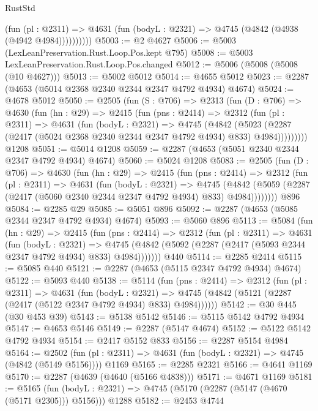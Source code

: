\begin{lexlean}{RustStd}
\begin{coremodule}
              (fun (pl : @2311) =>
              @4631 (fun (bodyL : @2321) => @4745 (@4842 (@4938 (@4942 @4984))))))))))
@5003 := @2 @4627
@5006 := @5003 (LexLeanPreservation.Rust.Loop.Pos.kept @795)
@5008 := @5003 LexLeanPreservation.Rust.Loop.Pos.changed
@5012 := @5006 (@5008 (@5008 (@10 @4627)))
@5013 := @5002 @5012
@5014 := @4655 @5012
@5023 := @2287 (@4653 (@5014 @2368 @2340 @2344 @2347 @4792 @4934) @4674)
@5024 := @4678 @5012
@5050 := @2505
    (fun (S : @706) =>
    @2313
      (fun (D : @706) =>
      @4630
        (fun (hn : @29) =>
        @2415
          (fun (pns : @2414) =>
          @2312
            (fun (pl : @2311) =>
            @4631
              (fun (bodyL : @2321) =>
              @4745
                (@4842
                  (@5023
                    (@2287 (@2417 (@5024 @2368 @2340 @2344 @2347 @4792 @4934) @833) @4984)))))))))
    @1208
@5051 := @5014 @1208
@5059 := @2287 (@4653 (@5051 @2340 @2344 @2347 @4792 @4934) @4674)
@5060 := @5024 @1208
@5083 := @2505
    (fun (D : @706) =>
    @4630
      (fun (hn : @29) =>
      @2415
        (fun (pns : @2414) =>
        @2312
          (fun (pl : @2311) =>
          @4631
            (fun (bodyL : @2321) =>
            @4745
              (@4842 (@5059 (@2287 (@2417 (@5060 @2340 @2344 @2347 @4792 @4934) @833) @4984))))))))
    @896
@5084 := @2285 @29
@5085 := @5051 @896
@5092 := @2287 (@4653 (@5085 @2344 @2347 @4792 @4934) @4674)
@5093 := @5060 @896
@5113 := @5084
    (fun (hn : @29) =>
    @2415
      (fun (pns : @2414) =>
      @2312
        (fun (pl : @2311) =>
        @4631
          (fun (bodyL : @2321) =>
          @4745 (@4842 (@5092 (@2287 (@2417 (@5093 @2344 @2347 @4792 @4934) @833) @4984)))))))
    @440
@5114 := @2285 @2414
@5115 := @5085 @440
@5121 := @2287 (@4653 (@5115 @2347 @4792 @4934) @4674)
@5122 := @5093 @440
@5138 := @5114
    (fun (pns : @2414) =>
    @2312
      (fun (pl : @2311) =>
      @4631
        (fun (bodyL : @2321) =>
        @4745 (@4842 (@5121 (@2287 (@2417 (@5122 @2347 @4792 @4934) @833) @4984))))))
@5142 := @30 @445 (@30 @453 @39)
@5143 := @5138 @5142
@5146 := @5115 @5142 @4792 @4934
@5147 := @4653 @5146
@5149 := @2287 (@5147 @4674)
@5152 := @5122 @5142 @4792 @4934
@5154 := @2417 @5152 @833
@5156 := @2287 @5154 @4984
@5164 := @2502
    (fun (pl : @2311) => @4631 (fun (bodyL : @2321) => @4745 (@4842 (@5149 @5156))))
    @1169
@5165 := @2285 @2321
@5166 := @4641 @1169
@5170 := @2287 (@4639 (@4640 (@5166 @4838)))
@5171 := @4671 @1169
@5181 := @5165
    (fun (bodyL : @2321) => @4745 (@5170 (@2287 (@5147 (@4670 (@5171 @2305))) @5156)))
    @1288
@5182 := @2453 @4744

\end{coremodule}
\end{lexlean}
